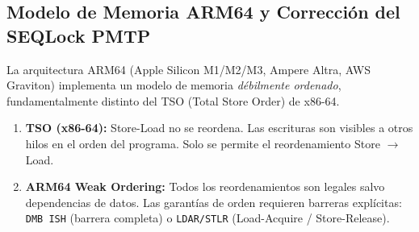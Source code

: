 \subsection{Modelo de Memoria ARM64 y Corrección del SEQLock PMTP}


La arquitectura ARM64 (Apple Silicon M1/M2/M3, Ampere Altra, AWS Graviton)
implementa un modelo de memoria \emph{débilmente ordenado}, fundamentalmente
distinto del TSO (Total Store Order) de x86-64.

\begin{definition}

\begin{enumerate}
    \item \textbf{TSO (x86-64):} Store-Load no se reordena. Las escrituras
    son visibles a otros hilos en el orden del programa. Solo se permite
    el reordenamiento Store $\to$ Load.
    
    \item \textbf{ARM64 Weak Ordering:} Todos los reordenamientos son 
    legales salvo dependencias de datos. Las garantías de orden requieren
    barreras explícitas: \texttt{DMB ISH} (barrera completa) o 
    \texttt{LDAR/STLR} (Load-Acquire / Store-Release).
\end{enumerate}
\end{definition}


